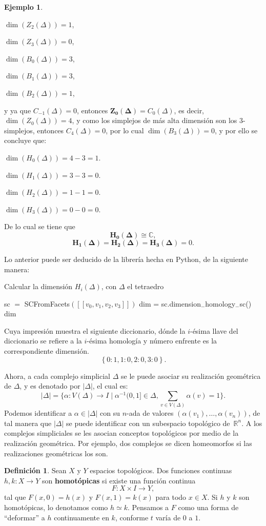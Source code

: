 \documentclass[12pt]{book}
\theoremstyle{definition}
\newtheorem{definition}[theorem]{Definición}
\newtheorem{example}[theorem]{Ejemplo}
\newcounter{in}
\newcounter{ini}
\begin{document}
\begin{example}
\begin{center}
  $\dim(Z_{2}(\Delta)) = 1$,

  $\dim(Z_{3}(\Delta)) = 0$,

  $\dim(B_{0}(\Delta)) = 3$,

  $\dim(B_{1}(\Delta)) = 3$,

  $\dim(B_{2}(\Delta)) = 1$,
\end{center}
y ya que $C_{-1}(\Delta)=0$, entonces
$\boldsymbol{Z_{0}(\Delta)}=C_{0}(\Delta)$, es decir,
$\dim(Z_{0}(\Delta))=4$, y como los simplejos de más alta dimensión
son los $3$-simplejos, entonces $C_4(\Delta) = 0$, por lo cual
$\dim(B_{3}(\Delta))=0$, y por ello se concluye que:
\begin{center}
 $\dim(H_{0}(\Delta))=4-3=1.$

 $\dim(H_{1}(\Delta))=3-3=0.$

 $\dim(H_{2}(\Delta))=1-1=0.$

 $\dim(H_{3}(\Delta))=0-0=0.$
\end{center}
De lo cual se tiene que
$$\boldsymbol{H_{0}(\Delta)} \cong \mathbb{C},$$
$$\boldsymbol{H_{1}(\Delta)}=\boldsymbol{H_{2}(\Delta)}=\boldsymbol{H_{3}(\Delta)}=0.$$
\end{example}
Lo anterior puede ser deducido de la librería hecha en Python, de la
siguiente manera:
\begin{algorithm}[H]
\caption{Calcular la dimensión $H_{i}(\Delta)$, con $\Delta$ el tetraedro}
\begin{algorithmic}
\STATE sc $=$ SCFromFacets$(\left [ \left [ v_0,v_1,v_2,v_3 \right ] \right ])$
\STATE dim = sc.dimension$_{-}$homology$_{-}$sc()
\PRINT dim
\end{algorithmic}
\end{algorithm}
Cuya impresión muestra el siguiente diccionario, dónde la $i$-ésima
llave del diccionario se refiere a la $i$-ésima homología y número
enfrente es la correspondiente dimensión.
$$ \left \{0: 1, 1: 0, 2: 0, 3: 0  \right \}.$$

Ahora, a cada complejo simplicial $\Delta$ se le puede asociar su
realización geométrica de $\Delta$, y es denotado por $|\Delta|$, el
cual es:
\begin{equation}
  \label{eq:112}
|\Delta|=\{\alpha:V(\Delta)\rightarrow I\mid\alpha^{-1}(0,1]\in
\Delta, \sum _{v\in V(\Delta)}\alpha(v)=1\}.
\end{equation}
Podemos identificar a $\alpha\in |\Delta|$ con su $n$-ada de valores
$(\alpha(v_{1}),\dots,\alpha(v_{n}))$, de tal manera que $|\Delta|$ se
puede identificar con un subespacio topológico de~$\mathbb{R}^{n}$.
A los complejos simpliciales se les asocian conceptos topológicos por
medio de la realización geométrica. Por ejemplo, dos complejos se
dicen homeomorfos si las realizaciones geométricas los son.
\begin{definition}
  Sean $X$ y $Y$ espacios topológicos. Dos funciones continuas
  $h,k:X\rightarrow Y$ son \textbf{homotópicas} si existe una función continua
  $$F:X\times I\rightarrow Y,$$
  tal que $F(x,0)=h(x)$ y $F(x,1)=k(x)$ para todo $x\in X.$ Si $h$ y
  $k$ son homotópicas, lo denotamos como $h\simeq k$. Pensamos a $F$
  como una forma de ``deformar'' a $h$ continuamente en $k$, conforme
  $t$ varía de $0$ a $1$.
\end{definition}
\end{document}
